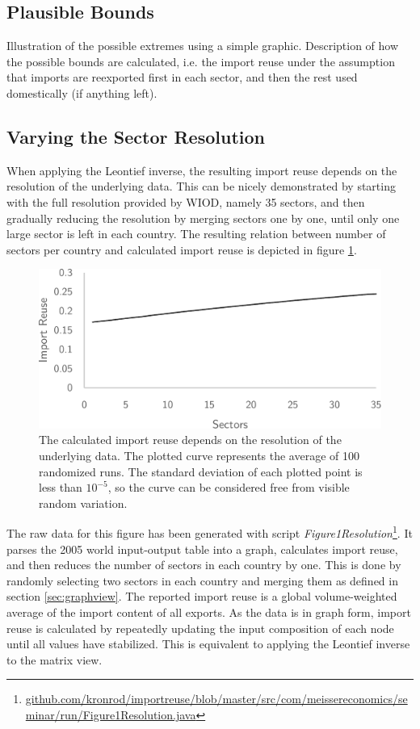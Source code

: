 \documentclass[english]{uzhpub}
\begin{document}
\subsection{Plausible Bounds}
Illustration of the possible extremes using a simple graphic. Description of how the possible bounds are calculated, i.e. the import reuse under the assumption that imports are reexported first in each sector, and then the rest used domestically (if anything left).

\subsection{Varying the Sector Resolution}
When applying the Leontief inverse, the resulting import reuse depends on the resolution of the underlying data. This can be nicely demonstrated by starting with the full resolution provided by WIOD, namely 35 sectors, and then gradually reducing the resolution by merging sectors one by one, until only one large sector is left in each country. The resulting relation between number of sectors per country and calculated import reuse is depicted in figure \ref{fig:resolution}.

\begin{figure}
\centering
\includegraphics[scale=0.5]{../data/resolution}
\caption{The calculated import reuse depends on the resolution of the underlying data. The plotted curve represents the average of 100 randomized runs. The standard deviation of each plotted point is less than $10^{-5}$, so the curve can be considered free from visible random variation.} \label{fig:resolution}
\end{figure}

The raw data for this figure has been generated with script \emph{Figure1Resolution}\footnote{\href{https://github.com/kronrod/importreuse/blob/master/src/com/meissereconomics/seminar/run/Figure1Resolution.java}{github.com/kronrod/importreuse/blob/master/src/com/meissereconomics/seminar/run/Figure1Resolution.java}}. It parses the 2005 world input-output table into a graph, calculates import reuse, and then reduces the number of sectors in each country by one. This is done by randomly selecting two sectors in each country and merging them as defined in section \ref{sec:graphview}. The reported import reuse is a global volume-weighted average of the import content of all exports. As the data is in graph form, import reuse is calculated by repeatedly updating the input composition of each node until all values have stabilized. This is equivalent to applying the Leontief inverse to the matrix view.
\end{document}
